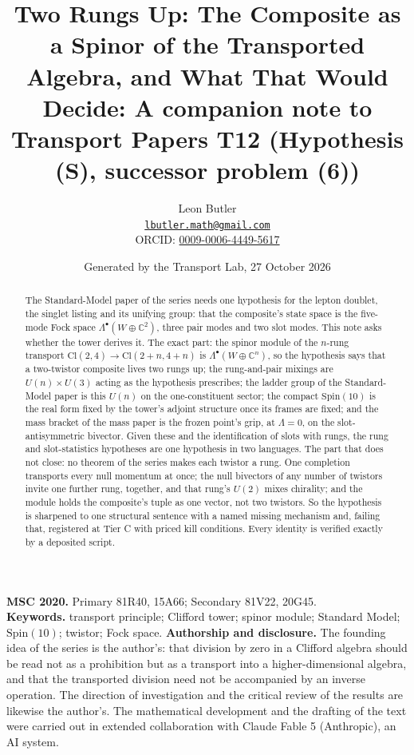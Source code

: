 \documentclass[11pt]{article}
\title{\bfseries Two Rungs Up: The Composite as a Spinor of the Transported Algebra, and What That Would Decide: A companion note to Transport Papers T12 (Hypothesis (S), successor problem (6))}
\author{Leon Butler\\ \normalsize\href{mailto:lbutler.math@gmail.com}{\texttt{lbutler.math@gmail.com}}\\ \normalsize ORCID: \href{https://orcid.org/0009-0006-4449-5617}{0009-0006-4449-5617}}
\date{Generated by the Transport Lab, 27 October 2026}
\theoremstyle{definition}
\theoremstyle{plain}
\providecommand{\C}{}\renewcommand{\C}{\mathbb{C}}
\providecommand{\Cl}{}\renewcommand{\Cl}{\mathrm{Cl}}
\begin{document}
\maketitle
\begin{abstract}
\normalsize
The Standard-Model paper of the series needs one hypothesis for the lepton doublet, the singlet listing and its unifying group: that the composite's state space is the five-mode Fock space $\Lambda^{\bullet}(W \oplus \C^{2})$, three pair modes and two slot modes. This note asks whether the tower derives it. The exact part: the spinor module of the $n$-rung transport $\Cl(2,4) \to \Cl(2{+}n, 4{+}n)$ is $\Lambda^{\bullet}(W \oplus \C^{n})$, so the hypothesis says that a two-twistor composite lives two rungs up; the rung-and-pair mixings are $U(n) \times U(3)$ acting as the hypothesis prescribes; the ladder group of the Standard-Model paper is this $U(n)$ on the one-constituent sector; the compact $\mathrm{Spin}(10)$ is the real form fixed by the tower's adjoint structure once its frames are fixed; and the mass bracket of the mass paper is the frozen point's grip, at $\Lambda = 0$, on the slot-antisymmetric bivector. Given these and the identification of slots with rungs, the rung and slot-statistics hypotheses are one hypothesis in two languages. The part that does not close: no theorem of the series makes each twistor a rung. One completion transports every null momentum at once; the null bivectors of any number of twistors invite one further rung, together, and that rung's $U(2)$ mixes chirality; and the module holds the composite's tuple as one vector, not two twistors. So the hypothesis is sharpened to one structural sentence with a named missing mechanism and, failing that, registered at Tier C with priced kill conditions. Every identity is verified exactly by a deposited script.
\end{abstract}
\medskip
\noindent\textbf{MSC 2020.} Primary 81R40, 15A66; Secondary 81V22, 20G45.\\
\textbf{Keywords.} transport principle; Clifford tower; spinor module; Standard Model; $\mathrm{Spin}(10)$; twistor; Fock space.
\newpage
\noindent \textbf{Authorship and disclosure. }The founding idea of the series is the author's: that division by zero in a Clifford algebra should be read not as a prohibition but as a transport into a higher-dimensional algebra, and that the transported division need not be accompanied by an inverse operation. The direction of investigation and the critical review of the results are likewise the author's. The mathematical development and the drafting of the text were carried out in extended collaboration with Claude Fable 5 (Anthropic), an AI system.
\end{document}
